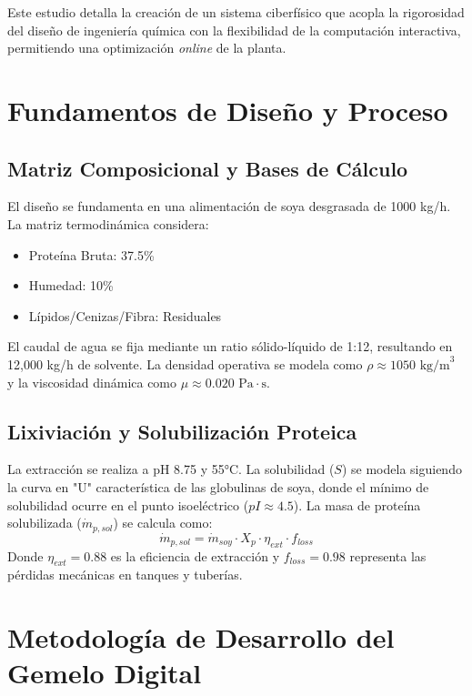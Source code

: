 \documentclass[12pt,a4paper,twocolumn]{article}
\begin{document}
Este estudio detalla la creación de un sistema ciberfísico que acopla la rigorosidad del diseño de ingeniería química con la flexibilidad de la computación interactiva, permitiendo una optimización \textit{online} de la planta.

\section{Fundamentos de Diseño y Proceso}

\subsection{Matriz Composicional y Bases de Cálculo}
El diseño se fundamenta en una alimentación de soya desgrasada de 1000 kg/h. La matriz termodinámica considera:
\begin{itemize}
    \item Proteína Bruta: 37.5\%
    \item Humedad: 10\%
    \item Lípidos/Cenizas/Fibra: Residuales
\end{itemize}
El caudal de agua se fija mediante un ratio sólido-líquido de 1:12, resultando en 12,000 kg/h de solvente. La densidad operativa se modela como $\rho \approx 1050 \text{ kg/m}^3$ y la viscosidad dinámica como $\mu \approx 0.020 \text{ Pa}\cdot\text{s}$.

\subsection{Lixiviación y Solubilización Proteica}
La extracción se realiza a pH 8.75 y 55°C. La solubilidad ($S$) se modela siguiendo la curva en "U" característica de las globulinas de soya, donde el mínimo de solubilidad ocurre en el punto isoeléctrico ($pI \approx 4.5$).
La masa de proteína solubilizada ($\dot{m}_{p,sol}$) se calcula como:
\begin{equation}
    \dot{m}_{p,sol} = \dot{m}_{soy} \cdot X_{p} \cdot \eta_{ext} \cdot f_{loss}
\end{equation}
Donde $\eta_{ext} = 0.88$ es la eficiencia de extracción y $f_{loss} = 0.98$ representa las pérdidas mecánicas en tanques y tuberías.

\section{Metodología de Desarrollo del Gemelo Digital}
\end{document}

